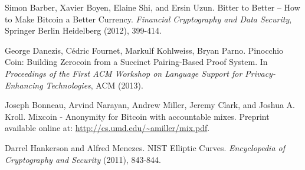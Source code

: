 \documentclass[conference]{IEEEtran}
\begin{document}
\begin{thebibliography}{1}


 Simon Barber, Xavier Boyen, Elaine Shi, and Ersin Uzun. Bitter to Better -- How to Make Bitcoin a Better Currency. \emph{Financial Cryptography and Data Security}, Springer Berlin Heidelberg (2012), 399-414.



 George Danezis, C\'{e}dric Fournet, Markulf Kohlweiss, Bryan Parno. Pinocchio Coin: Building Zerocoin from a Succinct Pairing-Based Proof System. In \emph{Proceedings of the First ACM Workshop on Language Support for Privacy-Enhancing Technologies}, ACM (2013).

 Joseph Bonneau, Arvind Narayan, Andrew Miller, Jeremy Clark, and Joshua A. Kroll. Mixcoin - Anonymity for Bitcoin with accountable mixes. Preprint available online at: \url{http://cs.umd.edu/~amiller/mix.pdf}.

 Darrel Hankerson and Alfred Menezes. NIST Elliptic Curves. \emph{Encyclopedia of Cryptography and Security} (2011), 843-844.


\end{thebibliography}

\appendix 
{}
\end{document}
